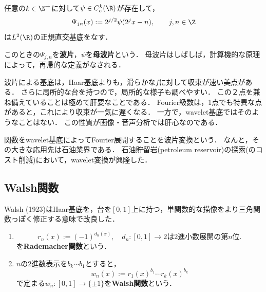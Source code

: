 \documentclass[uplatex,dvipdfmx]{jsreport}
\begin{document}
\begin{theorem}
    任意の$k\in\N^+$に対して$\psi\in C^{k}_c(\R)$が存在して，
    \[\Psi_{jn}(x):=2^{j/2}\psi(2^jx-n),\qquad j,n\in\Z\]
    は$L^2(\R)$の正規直交基底をなす．
\end{theorem}
\begin{definition}
    このときの$\Psi_{j,n}$を\textbf{波片}，$\psi$を\textbf{母波片}という．
    母波片はしばしば，計算機的な原理によって，再帰的な定義がなされる．
\end{definition}
\begin{remarks}
    波片による基底は，Haar基底よりも，滑らかな$f$に対して収束が速い美点がある．
    さらに局所的な台を持つので，局所的な様子も調べやすい．
    この２点を兼ね備えていることは極めて肝要なことである．
    Fourier級数は，1点でも特異な点があると，これにより収束が一気に遅くなる．
    一方で，wavelet基底ではそのようなことはない．
    この性質が画像・音声分析では肝心なのである．
\end{remarks}

\begin{application}
    関数をwavelet基底によってFourier展開することを波片変換という．
    なんと，その大きな応用先は石油業界である．
    石油貯留岩(petroleum reservoir)の探索(のコスト削減)において，wavelet変換が興隆した．
\end{application}

\subsection{Walsh関数}

\begin{tcolorbox}[colframe=ForestGreen, colback=ForestGreen!10!white,breakable,colbacktitle=ForestGreen!40!white,coltitle=black,fonttitle=\bfseries\sffamily,
title=]
    Walsh (1923)はHaar基底を，台を$[0,1]$上に持つ，単関数的な描像をより三角関数っぽく修正する意味で改良した．
\end{tcolorbox}

\begin{definition}\mbox{}
    \begin{enumerate}
        \item \[r_n(x):=(-1)^{d_n(x)},\quad d_n:[0,1]\to2\text{は2進小数展開の第}n\text{位}.\]
        を\textbf{Rademacher関数}という．
        \item $n$の2進数表示を$b_k\cdots b_1$とすると，
        \[w_n(x):=r_1(x)^{b_1}\cdots r_k(x)^{b_k}\]
        で定まる$w_n:[0,1]\to\{\pm1\}$を\textbf{Walsh関数}という．
    \end{enumerate}
\end{definition}
\end{document}
